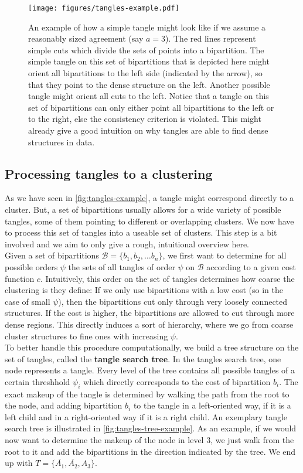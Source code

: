 \begin{figure}[h]
    \centering
    \texttt{[image: figures/tangles-example.pdf]}
    \caption{An example of how a simple tangle might look like if we assume a reasonably sized agreement (say $a = 3$). The red lines represent simple cuts which divide the sets of points into a bipartition.
    The simple tangle on this set of bipartitions that is depicted here might orient all bipartitions to the left side (indicated by the arrow), so that they point to the dense structure on the left. Another 
possible tangle might orient all cuts to the left. Notice that a tangle on this set of bipartitions can only either point all bipartitions to the left or to the right, else
the consistency criterion is violated. This might already give a good intuition on why tangles are able to find dense structures in data.}
    \label{fig:tangles-example}
\end{figure}
\FloatBarrier

\subsection{Processing tangles to a clustering}
As we have seen in \autoref{fig:tangles-example}, a tangle might correspond directly to a cluster. But, a set of bipartitions usually allows for a wide 
variety of possible tangles, some of them pointing to different or overlapping clusters. We now have to process this set of tangles into a useable set of clusters.
This step is a bit involved and we aim to only give a rough, intuitional overview here. \\

Given a set of bipartitions $\mathcal{B} = \{b_1, b_2, \ldots b_n\} $, we first want to determine for all possible orders $\psi$ the sets of all tangles of order $\psi$ on $\mathcal{B}$ 
according to a given cost function $c$. Intuitively, this order on the set of tangles determines how coarse the clustering is they define:
If we only use bipartitions with a low cost (so in the case of small $\psi$), then the bipartitions cut only through very loosely connected structures. 
If the cost is higher, the bipartitions are allowed to cut through more dense regions. This directly induces a sort of hierarchy, where we go from coarse cluster
structures to fine ones with increasing $\psi$. \\
To better handle this procedure computationally, we build a tree structure on the set of tangles, called the \textbf{tangle search tree}. In the tangles search tree, 
one node represents a tangle. Every level of the tree contains all possible tangles of a certain threshhold $\psi_i$ which directly corresponds to the cost of bipartition $b_i$. 
The exact makeup of the tangle is determined by walking the path from the root to the node, and adding bipartition $b_i$ to the tangle in a left-oriented way, if it is a left child and
in a right-oriented way if it is a right child. An exemplary tangle search tree is illustrated in \autoref{fig:tangles-tree-example}. As an example, if we would now want to determine
the makeup of the node in level 3, we just walk from the root to it and add the bipartitions in the direction indicated by the tree. We end up with $T = \{\overline{A_1}, \overline{A_2}, A_3\}$. 

